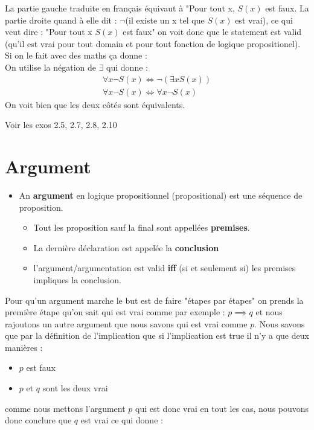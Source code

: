 La partie gauche traduite en français équivaut à "Pour tout x, $S(x)$ est faux. La partie droite quand à elle dit : $\neg$(il existe un x tel que $S(x)$ est vrai), ce qui veut dire : "Pour tout x $S(x)$ est faux" on voit donc que le statement est valid (qu'il est vrai pour tout domain et pour tout fonction de logique propositionel).
\\
Si on le fait avec des maths ça donne : 
\\
On utilise la négation de $\exists$ qui donne : 
\begin{align*}
    \forall x \neg S(x) \iff \neg (\exists x S(x)) \\
    \forall x \neg S(x) \iff \forall x \neg S(x)
\end{align*}
On voit bien que les deux côtés sont équivalents.

Voir les exos 2.5, 2.7, 2.8, 2.10

\section{Argument}
\begin{itemize}
    \item An \textbf{argument} en logique propositionnel (propositional) est une séquence de proposition.
    \begin{itemize}
        \item Tout les proposition sauf la final sont appellées \textbf{premises}.
        \item La dernière déclaration est appelée la \textbf{conclusion}
        \item l'argument/argumentation est valid \textbf{iff} (si et seulement si) les premises impliques la conclusion.
    \end{itemize}
\end{itemize}
Pour qu'un argument marche le but est de faire "étapes par étapes" on prends la première étape qu'on sait qui est vrai comme par exemple : $p \implies q$ et nous rajoutons un autre argument que nous savons qui est vrai comme $p$. Nous savons que par la définition de l'implication que si l'implication est true il n'y a que deux manières : 
\begin{itemize}
    \item $p$ est faux
    \item $p$ et $q$ sont les deux vrai
\end{itemize}
 comme nous mettons l'argument $p$ qui est donc vrai en tout les cas, nous pouvons donc conclure que $q$ est vrai ce qui donne :

